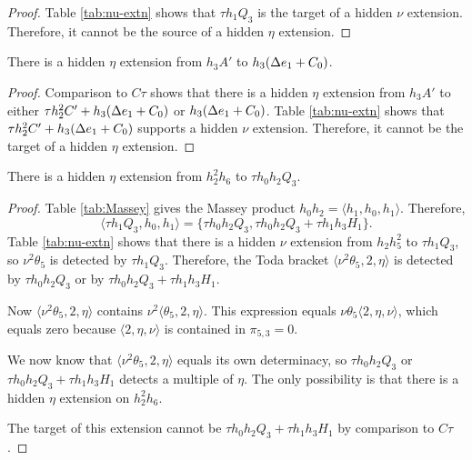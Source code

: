 \begin{proof}
Table \ref{tab:nu-extn} shows that $\tau h_1 Q_3$
is the target of a hidden $\nu$ extension.
Therefore, it cannot be the source of a hidden $\eta$
extension.
\end{proof}

\begin{lemma}
\label{lem:eta-h3A'}
There is a hidden $\eta$ extension from $h_3 A'$ to
$h_3 (\Delta e_1 + C_0)$.
\end{lemma}

\begin{proof}
Comparison to $C\tau$ shows that there is a hidden
$\eta$ extension from $h_3 A'$ to either
$\tau h_2^2 C' + h_3(\Delta e_1 + C_0)$ or
$h_3 (\Delta e_1 + C_0)$.
Table \ref{tab:nu-extn} shows that
$\tau h_2^2 C' + h_3(\Delta e_1 + C_0)$ supports a hidden
$\nu$ extension.  Therefore, it cannot be the target of a
hidden $\eta$ extension.
\end{proof}

\begin{lemma}
\label{lem:eta-h2^2h6}
There is a hidden $\eta$ extension from $h_2^2 h_6$ to
$\tau h_0 h_2 Q_3$.
\end{lemma}

\begin{proof}
Table \ref{tab:Massey} gives the Massey product
$h_0 h_2 = \langle h_1, h_0, h_1 \rangle$.
Therefore,
\[
\langle \tau h_1 Q_3, h_0, h_1 \rangle = 
\{ \tau h_0 h_2 Q_3, \tau h_0 h_2 Q_3 + \tau h_1 h_3 H_1 \}.
\]
Table \ref{tab:nu-extn} shows that
there is a hidden $\nu$ extension from
$h_2 h_5^2$ to $\tau h_1 Q_3$, so
$\nu^2 \theta_5$ is detected by $\tau h_1 Q_3$.
Therefore,
the Toda bracket $\langle \nu^2 \theta_5, 2, \eta \rangle$
is detected by $\tau h_0 h_2 Q_3$ or by 
$\tau h_0 h_2 Q_3 + \tau h_1 h_3 H_1$.

Now $\langle \nu^2 \theta_5, 2, \eta \rangle$
contains $\nu^2 \langle \theta_5, 2, \eta \rangle$. This 
expression 
equals $\nu \theta_5 \langle 2, \eta, \nu \rangle$, which
equals zero because $\langle 2, \eta, \nu \rangle$ is contained
in $\pi_{5,3} = 0$.

We now know that $\langle \nu^2 \theta_5, 2, \eta \rangle$
equals its own determinacy, so
$\tau h_0 h_2 Q_3$ or $\tau h_0 h_2 Q_3 + \tau h_1 h_3 H_1$
detects a multiple of $\eta$.
The only possibility is that there is a hidden $\eta$
extension on $h_2^2 h_6$.

The target of this extension cannot be
$\tau h_0 h_2 Q_3 + \tau h_1 h_3 H_1$ by comparison 
to $C\tau$.
\end{proof}

